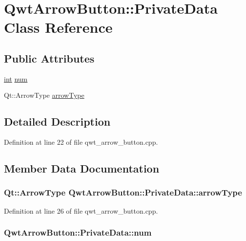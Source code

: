 \hypertarget{class_qwt_arrow_button_1_1_private_data}{\section{Qwt\-Arrow\-Button\-:\-:Private\-Data Class Reference}
\label{class_qwt_arrow_button_1_1_private_data}
}
\subsection*{Public Attributes}
\begin{DoxyCompactItemize}
\item 
\hyperlink{ioapi_8h_a787fa3cf048117ba7123753c1e74fcd6}{int} \hyperlink{class_qwt_arrow_button_1_1_private_data_acd4481eed6b92c8f56fec90b751a3131}{num}
\item 
Qt\-::\-Arrow\-Type \hyperlink{class_qwt_arrow_button_1_1_private_data_a2988a1948ffb29e8ec967326aaecd764}{arrow\-Type}
\end{DoxyCompactItemize}


\subsection{Detailed Description}


Definition at line 22 of file qwt\-\_\-arrow\-\_\-button.\-cpp.



\subsection{Member Data Documentation}
\hypertarget{class_qwt_arrow_button_1_1_private_data_a2988a1948ffb29e8ec967326aaecd764}{
\subsubsection[{arrow\-Type}]{\setlength{\rightskip}{0pt plus 5cm}Qt\-::\-Arrow\-Type Qwt\-Arrow\-Button\-::\-Private\-Data\-::arrow\-Type}}\label{class_qwt_arrow_button_1_1_private_data_a2988a1948ffb29e8ec967326aaecd764}


Definition at line 26 of file qwt\-\_\-arrow\-\_\-button.\-cpp.

\hypertarget{class_qwt_arrow_button_1_1_private_data_acd4481eed6b92c8f56fec90b751a3131}{
\subsubsection[{num}]{ Qwt\-Arrow\-Button\-::\-Private\-Data\-::num}}\label{class_qwt_arrow_button_1_1_private_data_acd4481eed6b92c8f56fec90b751a3131}


